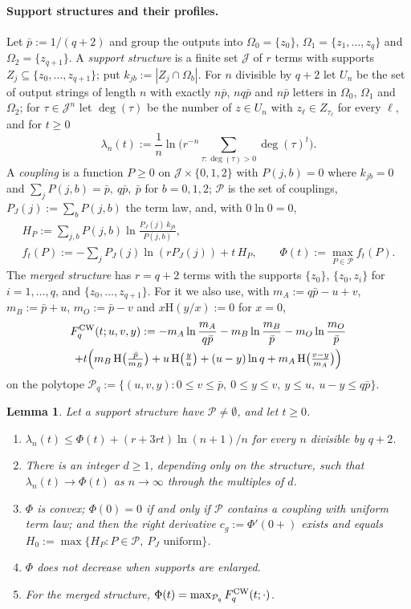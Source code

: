 \documentclass[11pt]{article}
\newtheorem{lemma}[theorem]{Lemma}
\theoremstyle{definition}
\theoremstyle{remark}
\newcommand{\Hh}{\mathrm{H}}
\begin{document}
\paragraph{Support structures and their profiles.} Let $\bar p:=1/(q+2)$ and group the outputs into $\Omega_0=\{z_0\}$, $\Omega_1=\{z_1,\dots,z_q\}$ and $\Omega_2=\{z_{q+1}\}$. A \emph{support structure} is a finite set $\mathcal J$ of $r$ terms with supports $Z_j\subseteq\{z_0,\dots,z_{q+1}\}$; put $k_{jb}:=|Z_j\cap\Omega_b|$. For $n$ divisible by $q+2$ let $U_n$ be the set of output strings of length $n$ with exactly $n\bar p$, $nq\bar p$ and $n\bar p$ letters in $\Omega_0$, $\Omega_1$ and $\Omega_2$; for $\tau\in\mathcal J^n$ let $\deg(\tau)$ be the number of $z\in U_n$ with $z_\ell\in Z_{\tau_\ell}$ for every $\ell$, and for $t\ge0$
\[
\lambda_n(t):=\frac1n\ln\Big(r^{-n}\sum_{\tau:\deg(\tau)>0}\deg(\tau)^t\Big).
\]
A \emph{coupling} is a function $P\ge0$ on $\mathcal J\times\{0,1,2\}$ with $P(j,b)=0$ where $k_{jb}=0$ and $\sum_jP(j,b)=\bar p,\ q\bar p,\ \bar p$ for $b=0,1,2$; $\mathcal P$ is the set of couplings, $P_J(j):=\sum_bP(j,b)$ the term law, and, with $0\ln0=0$,
\begin{gather*}
H_P:=\sum_{j,b}P(j,b)\ln\frac{P_J(j)\,k_{jb}}{P(j,b)},\\
f_t(P):=-\sum_jP_J(j)\ln(rP_J(j))+t\,H_P,\qquad\Phi(t):=\max_{P\in\mathcal P}f_t(P).
\end{gather*}
The \emph{merged structure} has $r=q+2$ terms with the supports $\{z_0\}$, $\{z_0,z_i\}$ for $i=1,\dots,q$, and $\{z_0,\dots,z_{q+1}\}$. For it we also use, with $m_A:=q\bar p-u+v$, $m_B:=\bar p+u$, $m_O:=\bar p-v$ and $x\Hh(y/x):=0$ for $x=0$,
\begin{multline*}
F^{\rm CW}_q(t;u,v,y):=-m_A\ln\frac{m_A}{q\bar p}-m_B\ln\frac{m_B}{\bar p}-m_O\ln\frac{m_O}{\bar p}\\
+t\Big(m_B\,\Hh\big(\tfrac{\bar p}{m_B}\big)+u\,\Hh\big(\tfrac yu\big)+(u-y)\ln q+m_A\,\Hh\big(\tfrac{v-y}{m_A}\big)\Big)
\end{multline*}
on the polytope $\mathcal P_q:=\{(u,v,y):0\le v\le\bar p,\ 0\le y\le v,\ y\le u,\ u-y\le q\bar p\}$.

\begin{lemma}\label{a:lem:cwprofile}
Let a support structure have $\mathcal P\ne\emptyset$, and let $t\ge0$.
\begin{enumerate}[label=(\alph*),nosep]
\item $\lambda_n(t)\le\Phi(t)+(r+3rt)\ln(n+1)/n$ for every $n$ divisible by $q+2$.
\item There is an integer $d\ge1$, depending only on the structure, such that $\lambda_n(t)\to\Phi(t)$ as $n\to\infty$ through the multiples of $d$.
\item $\Phi$ is convex; $\Phi(0)=0$ if and only if $\mathcal P$ contains a coupling with uniform term law; and then the right derivative $c_g:=\Phi'(0+)$ exists and equals $H_0:=\max\{H_P:P\in\mathcal P,\ P_J\text{ uniform}\}$.
\item $\Phi$ does not decrease when supports are enlarged.
\item For the merged structure, $\Phi(t)=\max_{\mathcal P_q}F^{\rm CW}_q(t;\cdot)$.
\end{enumerate}
\end{lemma}
\end{document}
